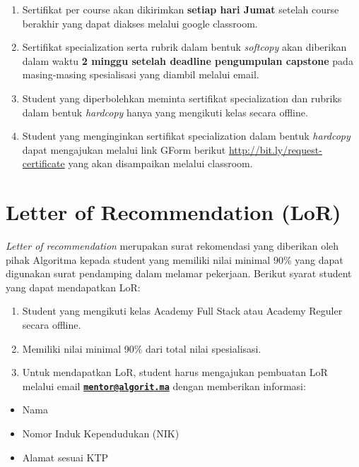 \documentclass[
]{book}
\providecommand{\tightlist}{%
  \setlength{\itemsep}{0pt}\setlength{\parskip}{0pt}}
\begin{document}
\begin{enumerate}
\def\labelenumi{\arabic{enumi}.}
\tightlist
\item
  Sertifikat per course akan dikirimkan \textbf{setiap hari Jumat} setelah course berakhir yang dapat diakses melalui google classroom.
\item
  Sertifikat specialization serta rubrik dalam bentuk \emph{softcopy} akan diberikan dalam waktu \textbf{2 minggu setelah deadline pengumpulan capstone} pada masing-masing spesialisasi yang diambil melalui email.
\item
  Student yang diperbolehkan meminta sertifikat specialization dan rubriks dalam bentuk \emph{hardcopy} hanya yang mengikuti kelas secara offline.\\
\item
  Student yang menginginkan sertifikat specialization dalam bentuk \emph{hardcopy} dapat mengajukan melalui link GForm berikut \url{http://bit.ly/request-certificate} yang akan disampaikan melalui classroom.
\end{enumerate}

\hypertarget{letter-of-recommendation-lor}{%
\section{Letter of Recommendation (LoR)}\label{letter-of-recommendation-lor}}

\emph{Letter of recommendation} merupakan surat rekomendasi yang diberikan oleh pihak Algoritma kepada student yang memiliki nilai minimal 90\% yang dapat digunakan surat pendamping dalam melamar pekerjaan. Berikut syarat student yang dapat mendapatkan LoR:

\begin{enumerate}
\def\labelenumi{\arabic{enumi}.}
\tightlist
\item
  Student yang mengikuti kelas Academy Full Stack atau Academy Reguler secara offline.
\item
  Memiliki nilai minimal 90\% dari total nilai spesialisasi.
\item
  Untuk mendapatkan LoR, student harus mengajukan pembuatan LoR melalui email \textbf{\href{mailto:mentor@algorit.ma}{\nolinkurl{mentor@algorit.ma}}} dengan memberikan informasi:
\end{enumerate}

\begin{itemize}
\tightlist
\item
  Nama
\item
  Nomor Induk Kependudukan (NIK)
\item
  Alamat sesuai KTP
\end{itemize}
\end{document}
